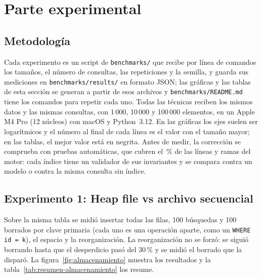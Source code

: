 \section{Parte experimental}\label{sec:experimentos}

\subsection{Metodología}

Cada experimento es un script de \texttt{benchmarks/} que recibe por línea de comandos los
tamaños, el número de consultas, las repeticiones y la semilla, y guarda sus mediciones en
\texttt{benchmarks/results/} en formato JSON; las gráficas y las tablas de esta sección se
generan a partir de esos archivos y \texttt{benchmarks/README.md} tiene los comandos para
repetir cada uno. Todas las técnicas reciben los mismos datos y las mismas consultas, con
1\,000, 10\,000 y 100\,000 elementos, en un Apple M4 Pro (12 núcleos) con macOS y
Python~3.12. En las gráficas los ejes suelen ser logarítmicos y el número al final de cada
línea es el valor con el tamaño mayor; en las tablas, el mejor valor está en negrita. Antes
de medir, la corrección se comprueba con \totalpruebas{} pruebas automáticas, que cubren el
\coberturapruebas{}\,\% de las líneas y ramas del motor: cada índice tiene un validador de
sus invariantes y se compara contra un modelo o contra la misma consulta sin índice.

\FloatBarrier
\subsection{Experimento 1: Heap file vs archivo secuencial}

Sobre la misma tabla se midió insertar todas las filas, 100 búsquedas y 100 borrados por
clave primaria (cada uno es una operación aparte, como un \texttt{WHERE id = k}), el espacio
y la reorganización. La reorganización no se forzó: se siguió borrando hasta que el
desperdicio pasó del 30\,\% y se midió el borrado que la disparó. La figura~\ref{fig:almacenamiento} muestra los resultados y la
tabla~\ref{tab:resumen-almacenamiento} los resume.


